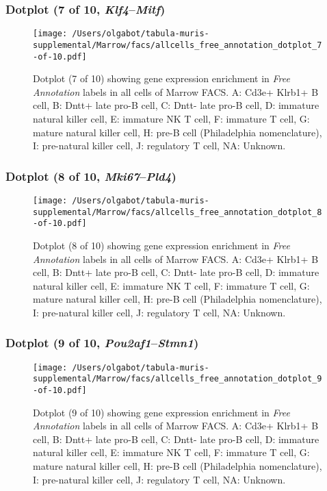 \clearpage

\subsubsection{Dotplot (7 of 10, \emph{Klf4}--\emph{Mitf})}
\begin{figure}[h]
\centering
\texttt{[image: /Users/olgabot/tabula-muris-supplemental/Marrow/facs/allcells\_free\_annotation\_dotplot\_7-of-10.pdf]}

\caption{ Dotplot (7 of 10)  showing gene expression enrichment in \emph{Free Annotation} labels in all cells of Marrow FACS. A: Cd3e+ Klrb1+ B cell, B: Dntt+ late pro-B cell, C: Dntt- late pro-B cell, D: immature natural killer cell, E: immature NK T cell, F: immature T cell, G: mature natural killer cell, H: pre-B cell (Philadelphia nomenclature), I: pre-natural killer cell, J: regulatory T cell, NA: Unknown.}
\end{figure}


\clearpage

\subsubsection{Dotplot (8 of 10, \emph{Mki67}--\emph{Pld4})}
\begin{figure}[h]
\centering
\texttt{[image: /Users/olgabot/tabula-muris-supplemental/Marrow/facs/allcells\_free\_annotation\_dotplot\_8-of-10.pdf]}

\caption{ Dotplot (8 of 10)  showing gene expression enrichment in \emph{Free Annotation} labels in all cells of Marrow FACS. A: Cd3e+ Klrb1+ B cell, B: Dntt+ late pro-B cell, C: Dntt- late pro-B cell, D: immature natural killer cell, E: immature NK T cell, F: immature T cell, G: mature natural killer cell, H: pre-B cell (Philadelphia nomenclature), I: pre-natural killer cell, J: regulatory T cell, NA: Unknown.}
\end{figure}


\clearpage

\subsubsection{Dotplot (9 of 10, \emph{Pou2af1}--\emph{Stmn1})}
\begin{figure}[h]
\centering
\texttt{[image: /Users/olgabot/tabula-muris-supplemental/Marrow/facs/allcells\_free\_annotation\_dotplot\_9-of-10.pdf]}

\caption{ Dotplot (9 of 10)  showing gene expression enrichment in \emph{Free Annotation} labels in all cells of Marrow FACS. A: Cd3e+ Klrb1+ B cell, B: Dntt+ late pro-B cell, C: Dntt- late pro-B cell, D: immature natural killer cell, E: immature NK T cell, F: immature T cell, G: mature natural killer cell, H: pre-B cell (Philadelphia nomenclature), I: pre-natural killer cell, J: regulatory T cell, NA: Unknown.}
\end{figure}


